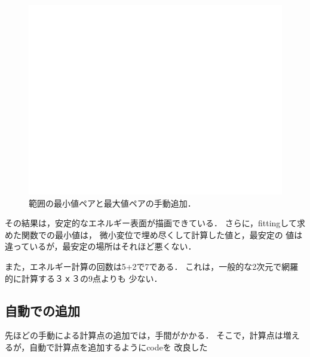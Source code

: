 \begin{figure}[H][htbp]
\centering
\begin{center}
\includegraphics[width=150mm]{../.././figs/thesis/thesis_009.jpeg}
\end{center}
\caption{範囲の最小値ペアと最大値ペアの手動追加．\label{spandata-label}}

\label{fig:}
\end{figure}

その結果は，安定的なエネルギー表面が描画できている．
さらに，fittingして求めた関数での最小値は，
微小変位で埋め尽くして計算した値と，最安定の
値は違っているが，最安定の場所はそれほど悪くない．

また，エネルギー計算の回数は5+2で7である．
これは，一般的な2次元で網羅的に計算する３ｘ３の9点よりも 少ない．

    \subsection{自動での追加}\label{ux81eaux52d5ux3067ux306eux8ffdux52a0}

先ほどの手動による計算点の追加では，手間がかかる．
そこで，計算点は増えるが，自動で計算点を追加するようにcodeを 改良した

